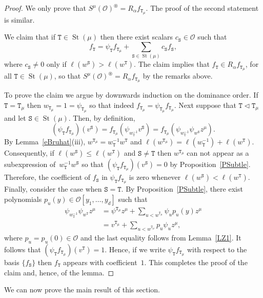 \documentclass[twoside,11pt,reqno]{amsart}
\numberwithin{equation}{section}
\theoremstyle{definition}  %
\DeclareMathOperator\ldom {\triangleleft}
\DeclareMathOperator\gdom {\triangleright}
\newcommand{\St}{\operatorname{St}}
\newcommand{\Stab}{\operatorname{Stab}}
\newcommand{\0}{{\bar 0}}
\newcommand{\1}{{\bar 1}}
\def\T{{\mathtt T}}
\def\U{{\mathtt U}}
\def\Stab{{\mathtt S}}
\renewcommand\O{\mathcal O}
\begin{document}
\begin{proof}
  We only prove that $S^\mu(\O)^\circledast=R_\alpha f_{\T_\mu}$. The proof of the second
  statement is similar. 

  We claim that if $\T\in\St(\mu)$ then there exist scalars $c_\Stab\in\O$ such that
  $$f_\T = \psi_\T f_{\T_\mu} + \sum_{\Stab\in\St(\mu)}c_\Stab f_\Stab,$$
  where $c_\Stab\ne0$ only if $\ell(w^\Stab)>\ell(w^\T)$.
  The claim implies that $f_\T\in R_\alpha f_{\T_\mu}$, for all
  $\T\in\St(\mu)$, so that $S^\mu(\O)^\circledast=R_\alpha f_{\T_\mu}$ by the remarks above. 
  
  To prove the claim we argue by downwards induction on the dominance order. If $\T=\T_\mu$
  then $w_{\T_\mu}=1=\psi_{\T_\mu}$ so that indeed 
  $f_{\T_\mu}=\psi_{\T_\mu}f_{\T_\mu}$. %
  Next suppose that $\T\ldom\T_\mu$ and let
  $\Stab\in\St(\mu)$. Then, by definition,
  $$(\psi_\T f_{\T_\mu})(v^\Stab)=f_{\T_\mu}(\psi_{w_\T^{-1}} v^\Stab)
                         =f_{\T_\mu}(\psi_{w_\T^{-1}}\psi_{w^\Stab} z^\mu).$$
  By Lemma~\ref{eBruhat}(iii), $w^{\T_\mu}=w_\T^{-1}w^\T$ and $\ell(w^{\T_\mu})=\ell(w_\T^{-1})+\ell(w^\T)$.
  Consequently, if $\ell(w^\Stab)\le\ell(w^\T)$ and $\Stab\ne\T$ then $w^{\T_\mu}$ can not appear as a
  subexpression of~$w_\T^{-1}w^\Stab$ so that $(\psi_\T f_{\T_\mu})(v^\Stab)=0$ by Proposition~\ref{PSubtle}.
  Therefore, the coefficient of $f_\Stab$ in $\psi_\T f_{\T_\mu}$ is zero whenever $\ell(w^\Stab)<\ell(w^\T)$.
  Finally, consider the case when $\Stab=\T$. By Proposition~\ref{PSubtle}, there exist polynomials
  $p_u(y)\in\O[y_1,\dots,y_d]$ such that 
  \begin{align*}
  \psi_{w_\T^{-1}}\psi_{w^\T}z^\mu
        &=\psi^{\T_\mu}z^\mu +\sum_{u<w^{\T_\mu}}\psi_u p_u(y)z^\mu\\
        &=v^{\T_\mu} +\sum_{u<w^{\T_\mu}}p_u\psi_u z^\mu,
  \end{align*}
  where $p_u=p_u(0)\in\O$ and the last equality follows from Lemma~\ref{LZ1}. 
  It follows that $(\psi_\T f_{\T_\mu})(v^\T)=1$. 
  Hence, if
  we write $\psi_\T f_{\T_\mu}$ with respect to the basis $\{f_\Stab\}$ then $f_\T$ appears with
  coefficient~$1$. This completes the proof of the claim and,  hence, of the lemma.
\end{proof}

We can now prove the main result of this section.
\end{document}
